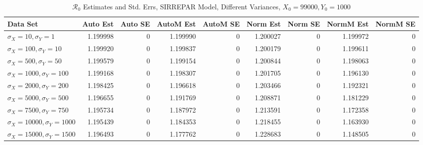 \documentclass[12pt]{article}
\newcommand{\rr}{\ensuremath{\mathcal{R}_0}}
\begin{document}
\begin{table} [H]
	
	\caption{$\rr$ Estimates and Std. Errs, SIRREPAR Model,
		Different Variances, 
		$X_0 = 99000, Y_0 = 1000$}
	\begin{footnotesize}
		\hskip -1.7cm
		\begin{tabular}{l|r|r|r|r|r|r|r|r}
			\hline
			Data Set & Auto Est & Auto SE & AutoM Est & AutoM SE & Norm Est & Norm SE & NormM Est & NormM SE\\
			\hline
			$\sigma_X = 10, \sigma_Y = 1$ & 1.199998 & 0 & 1.199990 & 0 & 1.200027 & 0 & 1.199972 & 0\\
			\hline
			$\sigma_X = 100, \sigma_Y = 10$ & 1.199920 & 0 & 1.199837 & 0 & 1.200179 & 0 & 1.199611 & 0\\
			\hline
			$\sigma_X = 500, \sigma_Y = 50$ & 1.199579 & 0 & 1.199154 & 0 & 1.200844 & 0 & 1.198063 & 0\\
			\hline
			$\sigma_X = 1000, \sigma_Y = 100$ & 1.199168 & 0 & 1.198307 & 0 & 1.201705 & 0 & 1.196130 & 0\\
			\hline
			$\sigma_X = 2000, \sigma_Y = 200$ & 1.198425 & 0 & 1.196618 & 0 & 1.203466 & 0 & 1.192321 & 0\\
			\hline
			$\sigma_X = 5000, \sigma_Y = 500$ & 1.196655 & 0 & 1.191769 & 0 & 1.208871 & 0 & 1.181229 & 0\\
			\hline
			$\sigma_X = 7500, \sigma_Y = 750$ & 1.195734 & 0 & 1.187972 & 0 & 1.213591 & 0 & 1.172358 & 0\\
			\hline
			$\sigma_X = 10000, \sigma_Y = 1000$ & 1.195439 & 0 & 1.184353 & 0 & 1.218455 & 0 & 1.163930 & 0\\
			\hline
			$\sigma_X = 15000, \sigma_Y = 1500$ & 1.196493 & 0 & 1.177762 & 0 & 1.228683 & 0 & 1.148505 & 0\\
			\hline
		\end{tabular}
	\end{footnotesize}
\end{table}
\end{document}
